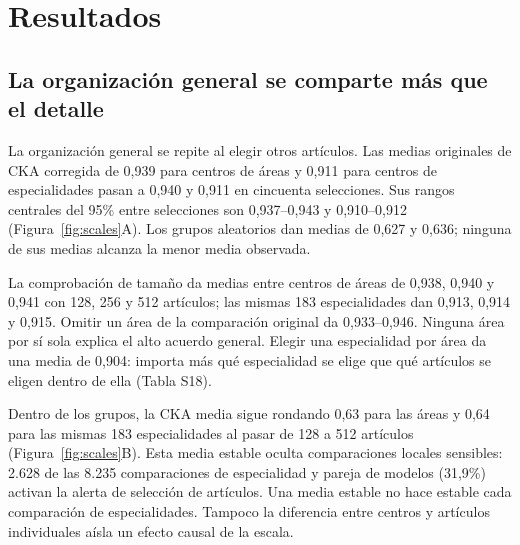 \documentclass[12pt]{article}
\begin{document}
\section{Resultados}
\FloatBarrier
\subsection{La organización general se comparte más que el detalle}
La organización general se repite al elegir otros artículos. Las medias originales de CKA corregida de 0,939 para centros de áreas y 0,911 para centros de especialidades pasan a 0,940 y 0,911 en cincuenta selecciones. Sus rangos centrales del 95\% entre selecciones son 0,937--0,943 y 0,910--0,912 (Figura~\ref{fig:scales}A). Los grupos aleatorios dan medias de 0,627 y 0,636; ninguna de sus medias alcanza la menor media observada.

La comprobación de tamaño da medias entre centros de áreas de 0,938, 0,940 y 0,941 con 128, 256 y 512 artículos; las mismas 183 especialidades dan 0,913, 0,914 y 0,915. Omitir un área de la comparación original da 0,933--0,946. Ninguna área por sí sola explica el alto acuerdo general. Elegir una especialidad por área da una media de 0,904: importa más qué especialidad se elige que qué artículos se eligen dentro de ella (Tabla S18).

Dentro de los grupos, la CKA media sigue rondando 0,63 para las áreas y 0,64 para las mismas 183 especialidades al pasar de 128 a 512 artículos (Figura~\ref{fig:scales}B). Esta media estable oculta comparaciones locales sensibles: 2.628 de las 8.235 comparaciones de especialidad y pareja de modelos (31,9\%) activan la alerta de selección de artículos. Una media estable no hace estable cada comparación de especialidades. Tampoco la diferencia entre centros y artículos individuales aísla un efecto causal de la escala.
\end{document}
